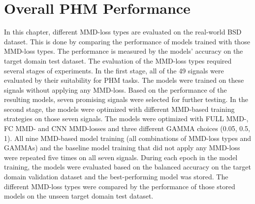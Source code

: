 \section{Overall PHM Performance}\label{ch:PHM_performance}
In this chapter, different MMD-loss types are evaluated on the real-world BSD dataset. This is done by comparing the performance of models trained with those MMD-loss types. The performance is measured by the models' accuracy on the target domain test dataset. The evaluation of the MMD-loss types required several stages of experiments.
In the first stage, all of the 49 signals were evaluated by their suitability for PHM tasks. The models were trained on these signals without applying any MMD-loss. Based on the performance of the resulting models, seven promising signals were selected for further testing. In the second stage, the models were optimized with different MMD-based training strategies on those seven signals. The models were optimized with FULL MMD-, FC MMD- and CNN MMD-losses and three different GAMMA choices (0.05, 0.5, 1). All nine MMD-based model training (all combinations of MMD-loss types and GAMMAs) and the baseline model training that did not apply any MMD-loss were repeated five times on all seven signals. During each epoch in the model training, the models were evaluated based on the balanced accuracy on the target domain validation dataset and the best-performing model was stored. The different MMD-loss types were compared by the performance of those stored models on the unseen target domain test dataset.




